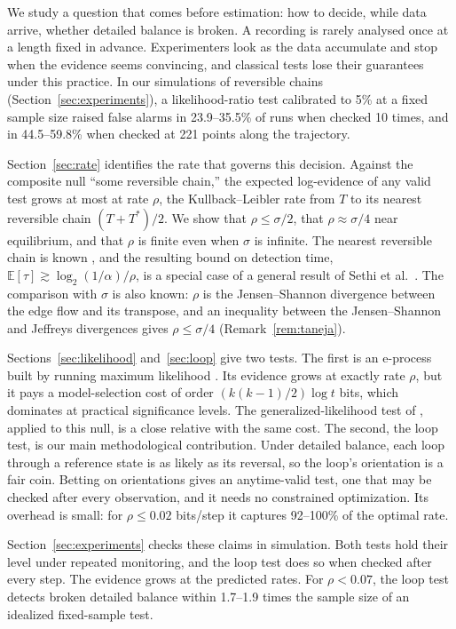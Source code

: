\documentclass[11pt]{article}
\theoremstyle{definition}
\theoremstyle{remark}
\newcommand{\E}{\mathbb{E}}
\begin{document}
We study a question that comes before estimation: how to decide, while data arrive, whether detailed balance is broken. A recording is rarely analysed once at a length fixed in advance. Experimenters look as the data accumulate and stop when the evidence seems convincing, and classical tests lose their guarantees under this practice. In our simulations of reversible chains (Section~\ref{sec:experiments}), a likelihood-ratio test calibrated to 5\% at a fixed sample size raised false alarms in 23.9--35.5\% of runs when checked 10 times, and in 44.5--59.8\% when checked at 221 points along the trajectory.

Section~\ref{sec:rate} identifies the rate that governs this decision. Against the composite null ``some reversible chain,'' the expected log-evidence of any valid test grows at most at rate $\rho$, the Kullback--Leibler rate from $T$ to its nearest reversible chain $(T+T^\ast)/2$. We show that $\rho\le\sigma/2$, that $\rho\approx\sigma/4$ near equilibrium, and that $\rho$ is finite even when $\sigma$ is infinite. The nearest reversible chain is known \cite{wolfer2021,andrieux2025}, and the resulting bound on detection time, $\E[\tau]\gtrsim\log_2(1/\alpha)/\rho$, is a special case of a general result of Sethi et al.\ \cite{sethi2026}. The comparison with $\sigma$ is also known: $\rho$ is the Jensen--Shannon divergence between the edge flow and its transpose, and an inequality between the Jensen--Shannon and Jeffreys divergences gives $\rho\le\sigma/4$ \cite{taneja2005,crooks2008} (Remark~\ref{rem:taneja}).

Sections~\ref{sec:likelihood} and~\ref{sec:loop} give two tests. The first is an e-process built by running maximum likelihood \cite{wasserman2020}. Its evidence grows at exactly rate $\rho$, but it pays a model-selection cost of order $(k(k-1)/2)\log t$ bits, which dominates at practical significance levels. The generalized-likelihood test of \cite{sethi2026}, applied to this null, is a close relative with the same cost. The second, the loop test, is our main methodological contribution. Under detailed balance, each loop through a reference state is as likely as its reversal, so the loop's orientation is a fair coin. Betting on orientations gives an anytime-valid test, one that may be checked after every observation, and it needs no constrained optimization. Its overhead is small: for $\rho\le0.02$ bits/step it captures 92--100\% of the optimal rate.

Section~\ref{sec:experiments} checks these claims in simulation. Both tests hold their level under repeated monitoring, and the loop test does so when checked after every step. The evidence grows at the predicted rates. For $\rho<0.07$, the loop test detects broken detailed balance within 1.7--1.9 times the sample size of an idealized fixed-sample test.
\end{document}
